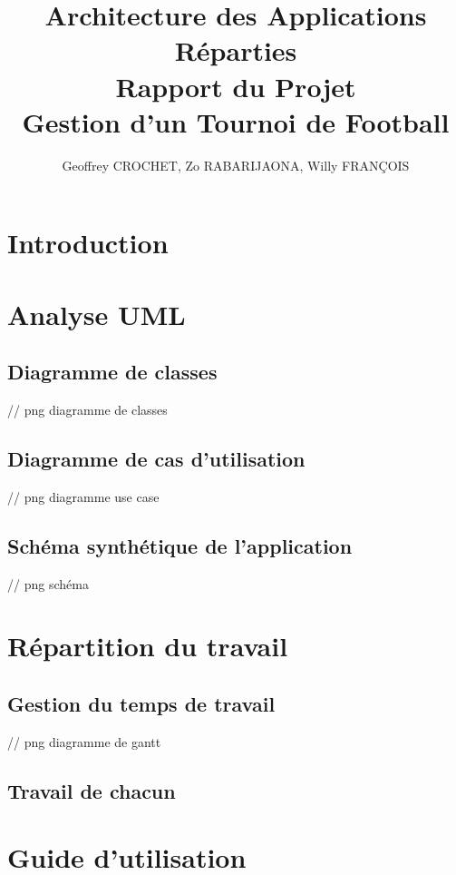 \documentclass[10pt]{report}
\title{Architecture des Applications Réparties\\ Rapport du Projet\\ Gestion d'un Tournoi de Football}
\author{Geoffrey CROCHET, Zo RABARIJAONA, Willy FRANÇOIS}
\begin{document}
\maketitle


\newpage

\tableofcontents


\newpage
\chapter*{Introduction}

\chapter{Analyse UML}
\section{Diagramme de classes}
// png diagramme de classes
\section{Diagramme de cas d'utilisation}
// png diagramme use case
\section{Schéma synthétique de l'application}
// png schéma


\chapter{Répartition du travail}
\section{Gestion du temps de travail}
// png diagramme de gantt
\section{Travail de chacun}

\chapter{Guide d'utilisation}
\end{document}
